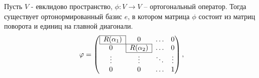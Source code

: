 \begin{theorem}
    Пусть $V$ - евклидово пространство, $\phi: V \to V$ -- ортогональный оператор. Тогда существует ортонормированный базис $e$, в котором матрица $\phi$ состоит из матриц поворота и единиц на главной диагонали.
     \[\phi = \left(\begin{array}{@{}cccc@{}}
		\cline{1-1}
		\multicolumn{1}{|c|}{R(\alpha_1)} & 0 & \dots & 0\\
		\cline{1-2}
		0 & \multicolumn{1}{|c|}{R(\alpha_2)} & \dots & 0\\
		\cline{2-2}
		\vdots & \vdots & \ddots & \vdots\\
		0 & 0 & \dots & 1\\
	\end{array}\right),\]
\end{theorem}

